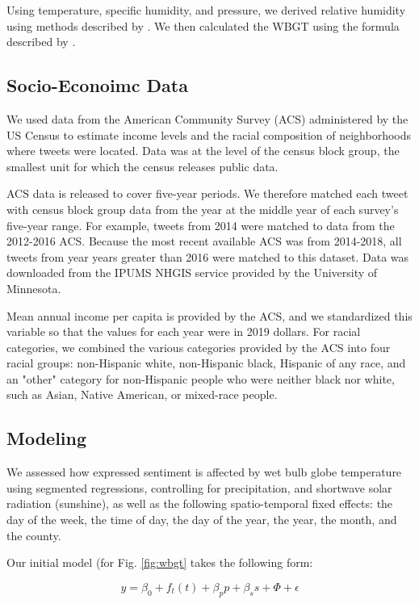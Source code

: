 \documentclass{article}
\begin{document}
Using temperature, specific humidity, and pressure, we derived relative humidity using methods described by  \cite{bolton_computation_1980}.  We then calculated the WBGT using the formula described by \cite{heo2019comparison}.

\subsection{Socio-Econoimc Data}
We used data from the American Community Survey (ACS) administered by the US Census to estimate income levels and the racial composition of neighborhoods where tweets were located.  Data was at the level of the census block group, the smallest unit for which the census releases public data.

ACS data is released to cover five-year periods.  We therefore matched each tweet with census block group data from the year at the middle year of each survey's five-year range.  For example, tweets from 2014 were matched to data from the 2012-2016 ACS.  Because the most recent available ACS was from 2014-2018, all tweets from year years greater than 2016 were matched to this dataset.  Data was downloaded from the IPUMS NHGIS service provided by the University of Minnesota.

Mean annual income per capita is provided by the ACS, and we standardized this variable so that the values for each year were in 2019 dollars.  For racial categories, we combined the various categories provided by the ACS into four racial groups: non-Hispanic white, non-Hispanic black, Hispanic of any race, and an "other" category for non-Hispanic people who were neither black nor white, such as Asian, Native American, or mixed-race people.

\subsection{Modeling}
We assessed how expressed sentiment is affected by wet bulb globe temperature using segmented regressions, controlling for precipitation, and shortwave solar radiation (sunshine), as well as the following spatio-temporal fixed effects: the day of the week, the time of day, the day of the year, the year, the month, and the county.  

Our initial model (for Fig. \ref{fig:wbgt} takes the following form:

\begin{equation}
    y = \beta_0 + f_t(t) + \beta_p p + \beta_s s + \Phi + \epsilon
\end{equation}
\end{document}
